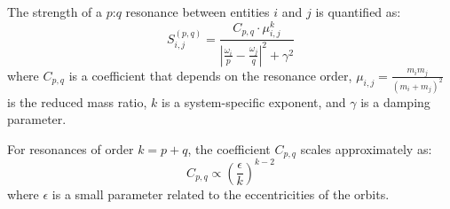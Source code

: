 \begin{definition}
The strength of a $p$:$q$ resonance between entities $i$ and $j$ is quantified as:
\begin{equation}
S_{i,j}^{(p,q)} = \frac{C_{p,q} \cdot \mu_{i,j}^{k}}{\left|\frac{\omega_i}{p} - \frac{\omega_j}{q}\right|^2 + \gamma^2}
\end{equation}
where $C_{p,q}$ is a coefficient that depends on the resonance order, $\mu_{i,j} = \frac{m_i m_j}{(m_i + m_j)^2}$ is the reduced mass ratio, $k$ is a system-specific exponent, and $\gamma$ is a damping parameter.
\end{definition}

\begin{theorem}
For resonances of order $k = p + q$, the coefficient $C_{p,q}$ scales approximately as:
\begin{equation}
C_{p,q} \propto \left(\frac{\epsilon}{k}\right)^{k-2}
\end{equation}
where $\epsilon$ is a small parameter related to the eccentricities of the orbits.
\end{theorem}

